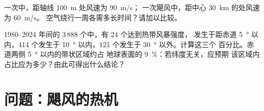 \begin{exercise}[$\star\star\star$]\label{exo:g10:storms-and-cyclones:14}
一次中，距轴线 \qty{100}{m} 处风速为 \qty{90}{m/s}；
一次飓风中，距中心 \qty{30}{km} 的处风速为 \qty{60}{m/s}。
空气绕行一周各需多长时间？请加以比较。
\end{exercise}

\begin{exercise}[$\star\star\star$]\label{exo:g10:storms-and-cyclones:15}
1980--2024 年间的 3\,888 个中，有 24 个达到热带风暴强度，
发生于距赤道 \qty{5}{\degree} 以内，414 个发生于
\qty{10}{\degree} 以内，121 个发生于 \qty{30}{\degree} 以外。计算这三个
百分比。赤道两侧 \qty{5}{\degree} 以内的带状区域约占
地球表面的 \qty{9}{\percent}：若纬度无关，应预期
该区域内占比应为多少？由此可得出什么结论？
\end{exercise}

\section{问题：飓风的热机}

